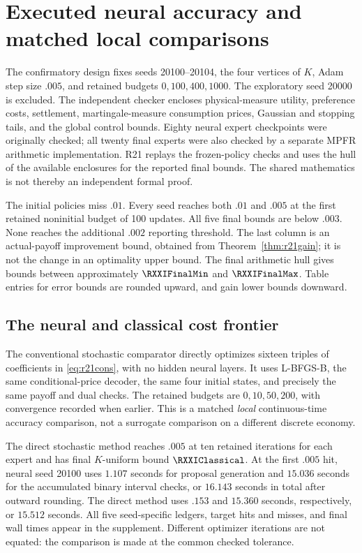 \section{Executed neural accuracy and matched local comparisons}\label{sec:r21results}
The confirmatory design fixes seeds 20100--20104, the four vertices of $K$, Adam step size $.005$, and retained budgets $0,100,400,1000$. The exploratory seed 20000 is excluded. The independent checker encloses physical-measure utility, preference costs, settlement, martingale-measure consumption prices, Gaussian and stopping tails, and the global control bounds. Eighty neural expert checkpoints were originally checked; all twenty final experts were also checked by a separate MPFR arithmetic implementation. R21 replays the frozen-policy checks and uses the hull of the available enclosures for the reported final bounds. The shared mathematics is not thereby an independent formal proof.



The initial policies miss $.01$. Every seed reaches both $.01$ and $.005$ at the first retained noninitial budget of 100 updates. All five final bounds are below $.003$. None reaches the additional $.002$ reporting threshold. The last column is an actual-payoff improvement bound, obtained from Theorem~\ref{thm:r21gain}; it is not the change in an optimality upper bound. The final arithmetic hull gives bounds between approximately $\RXXIFinalMin$ and $\RXXIFinalMax$. Table entries for error bounds are rounded upward, and gain lower bounds downward.

\subsection{The neural and classical cost frontier}
The conventional stochastic comparator directly optimizes sixteen triples of coefficients in \eqref{eq:r21cons}, with no hidden neural layers. It uses L-BFGS-B, the same conditional-price decoder, the same four initial states, and precisely the same payoff and dual checks. The retained budgets are $0,10,50,200$, with convergence recorded when earlier. This is a matched \emph{local} continuous-time accuracy comparison, not a surrogate comparison on a different discrete economy.

The direct stochastic method reaches $.005$ at ten retained iterations for each expert and has final $K$-uniform bound $\RXXIClassical$. At the first $.005$ hit, neural seed 20100 uses $1.107$ seconds for proposal generation and $15.036$ seconds for the accumulated binary interval checks, or $16.143$ seconds in total after outward rounding. The direct method uses $.153$ and $15.360$ seconds, respectively, or $15.512$ seconds. All five seed-specific ledgers, target hits and misses, and final wall times appear in the supplement. Different optimizer iterations are not equated: the comparison is made at the common checked tolerance.

